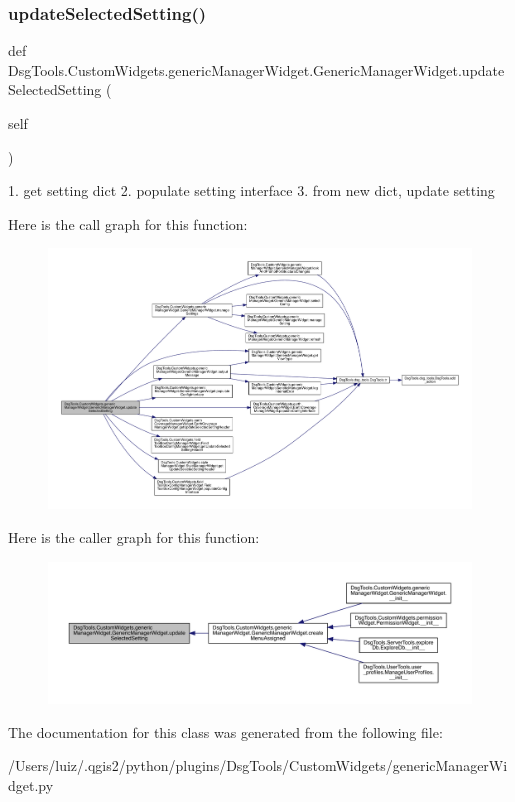 \subsubsection{\texorpdfstring{update\+Selected\+Setting()}{updateSelectedSetting()}}
{\footnotesize\ttfamily def Dsg\+Tools.\+Custom\+Widgets.\+generic\+Manager\+Widget.\+Generic\+Manager\+Widget.\+update\+Selected\+Setting (\begin{DoxyParamCaption}\item[{}]{self }\end{DoxyParamCaption})}

\begin{DoxyVerb}1. get setting dict
2. populate setting interface
3. from new dict, update setting
\end{DoxyVerb}
 Here is the call graph for this function\+:
\nopagebreak
\begin{figure}[H]
\begin{center}
\leavevmode
\includegraphics[width=350pt]{class_dsg_tools_1_1_custom_widgets_1_1generic_manager_widget_1_1_generic_manager_widget_a89b9e70f470c910e1edae2f8e3e4f28e_cgraph}
\end{center}
\end{figure}
Here is the caller graph for this function\+:
\nopagebreak
\begin{figure}[H]
\begin{center}
\leavevmode
\includegraphics[width=350pt]{class_dsg_tools_1_1_custom_widgets_1_1generic_manager_widget_1_1_generic_manager_widget_a89b9e70f470c910e1edae2f8e3e4f28e_icgraph}
\end{center}
\end{figure}


The documentation for this class was generated from the following file\+:\begin{DoxyCompactItemize}
\item 
/\+Users/luiz/.\+qgis2/python/plugins/\+Dsg\+Tools/\+Custom\+Widgets/generic\+Manager\+Widget.\+py\end{DoxyCompactItemize}
